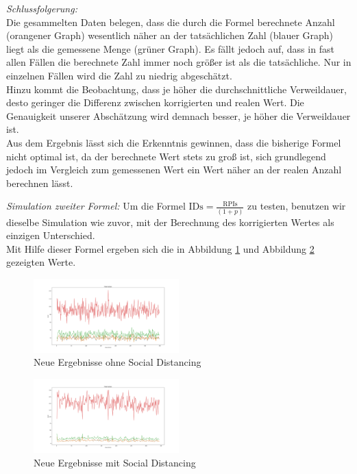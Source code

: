 \documentclass[conference]{IEEEtran}
\begin{document}
\textit{Schlussfolgerung:}\\
Die gesammelten Daten belegen, dass die durch die Formel berechnete Anzahl (orangener Graph) wesentlich näher an der tatsächlichen Zahl (blauer Graph) liegt als die gemessene Menge (grüner Graph). Es fällt jedoch auf, dass in fast allen Fällen die berechnete Zahl immer noch größer ist als die tatsächliche. Nur in einzelnen Fällen wird die Zahl zu niedrig abgeschätzt.\\
Hinzu kommt die Beobachtung, dass je höher die durchschnittliche Verweildauer, desto geringer die Differenz zwischen korrigierten und realen Wert. Die Genauigkeit unserer Abschätzung wird demnach besser, je höher die Verweildauer ist.\\

Aus dem Ergebnis lässt sich die Erkenntnis gewinnen, dass die bisherige Formel nicht optimal ist, da der berechnete Wert stets zu groß ist, sich grundlegend jedoch im Vergleich zum gemessenen Wert ein Wert näher an der realen Anzahl berechnen lässt.

\textit{Simulation zweiter Formel:}
Um die Formel $\text{IDs} = \frac{\text{RPIs}}{(1+p)}$
zu testen, benutzen wir dieselbe Simulation wie zuvor, mit der Berechnung des korrigierten Wertes als einzigen Unterschied.\\
Mit Hilfe dieser Formel ergeben sich die in Abbildung \ref{mast_data_plotted} und Abbildung \ref{mast_data_plotted_social_distancing} gezeigten Werte.

\begin{figure}[h]
	\centering
	\includegraphics[width=0.5\textwidth]{"Mast_Data_Plotted"}
	\caption{Neue Ergebnisse ohne Social Distancing}
	\label{mast_data_plotted}
\end{figure}

\begin{figure}[h]
	\centering
	\includegraphics[width=0.5\textwidth]{"Mast_Data_Plotted_Social_Distancing"}
	\caption{Neue Ergebnisse mit Social Distancing}
	\label{mast_data_plotted_social_distancing}
\end{figure}
\end{document}
